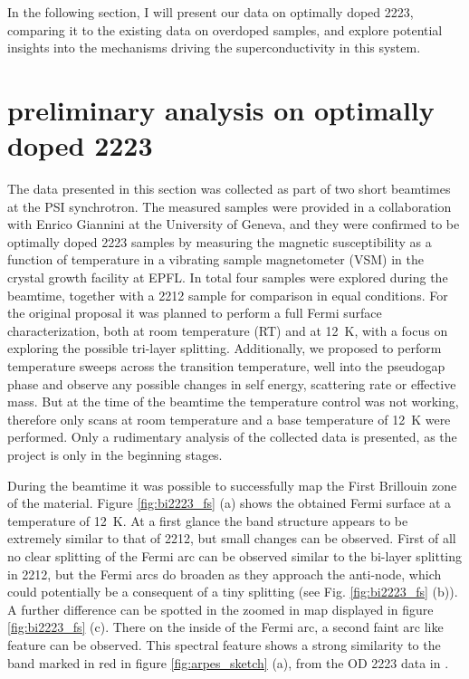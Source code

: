 In the following section, I will present our data on optimally doped 2223, comparing it to the existing data on overdoped samples, and explore potential insights into the mechanisms driving the superconductivity in this system.

\section{preliminary analysis on optimally doped 2223}

The data presented in this section was collected as part of two short beamtimes at the PSI synchrotron.
The measured samples were provided in a collaboration with Enrico Giannini at the University of Geneva, and they were confirmed to be optimally doped 2223 samples by measuring the magnetic susceptibility as a function of temperature in a vibrating sample magnetometer (VSM) in the crystal growth facility at EPFL.
In total four samples were explored during the beamtime, together with a 2212 sample for comparison in equal conditions.
For the original proposal it was planned to perform a full Fermi surface characterization, both at room temperature (RT) and at \qty{12}{\kelvin}, with a focus on exploring the possible tri-layer splitting.
Additionally, we proposed to perform temperature sweeps across the transition temperature, well into the pseudogap phase and observe any possible changes in self energy, scattering rate or effective mass.
But at the time of the beamtime the temperature control was not working, therefore only scans at room temperature and a base temperature of \qty{12}{\kelvin} were performed.
Only a rudimentary analysis of the collected data is presented, as the project is only in the beginning stages.

During the beamtime it was possible to successfully map the First Brillouin zone of the material.
Figure \ref{fig:bi2223_fs} (a) shows the obtained Fermi surface at a temperature of \qty{12}{\kelvin}.
At a first glance the band structure appears to be extremely similar to that of 2212, but small changes can be observed.
First of all no clear splitting of the Fermi arc can be observed similar to the bi-layer splitting in 2212, but the Fermi arcs do broaden as they approach the anti-node, which could potentially be a consequent of a tiny splitting (see Fig. \ref{fig:bi2223_fs} (b)).
A further difference can be spotted in the zoomed in map displayed in figure \ref{fig:bi2223_fs} (c).
There on the inside of the Fermi arc, a second faint arc like feature can be observed.
This spectral feature shows a strong similarity to the band marked in red in figure \ref{fig:arpes_sketch} (a), from the OD 2223 data in \cite{luo_electronic_2023}.

